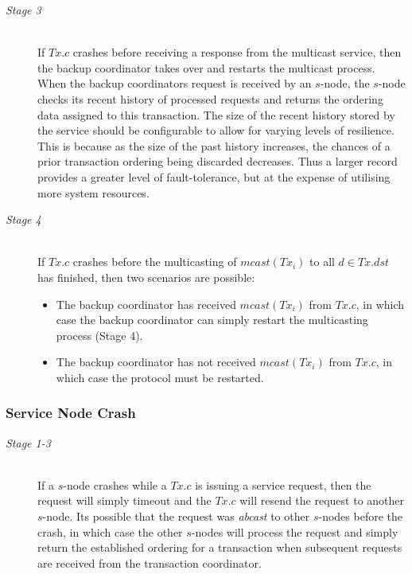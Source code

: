 \begin{description}
        \item[\emph{Stage 3}]  \hfill \\
        If $Tx.c$ crashes before receiving a response from the multicast service, then the backup coordinator takes over and restarts the multicast process.  When the backup coordinators request is received by an $s$-node, the $s$-node checks its recent history of processed requests and returns the ordering data assigned to this transaction.  The size of the recent history stored by the service should be configurable to allow for varying levels of resilience.   This is because as the size of the past history increases, the chances of a prior transaction ordering being discarded decreases.  Thus a larger record provides a greater level of fault-tolerance, but at the expense of utilising more system resources.  
        
        \item[\emph{Stage 4}]  \hfill \\
        If $Tx.c$ crashes before the multicasting of $mcast(Tx_i)$ to all $d \in Tx.dst$ has finished, then two scenarios are possible:
           \begin{itemize}
			    \item    The backup coordinator has received $mcast(Tx_i)$ from $Tx.c$, in which case the backup coordinator can simply restart the multicasting process (Stage 4).
			    \item    The backup coordinator has not received $mcast(Tx_i)$ from $Tx.c$, in which case the protocol must be restarted.  
		    \end{itemize}  
    \end{description}
    
	\subsubsection*{Service Node Crash}
	\begin{description}
       \item[\emph{Stage 1-3}] \hfill \\
       If a $s$-node crashes while a $Tx.c$ is issuing a service request, then the request will simply timeout and the $Tx.c$ will resend the request to another $s$-node.  Its possible that the request was \emph{abcast} to other $s$-nodes before the crash, in which case the other $s$-nodes will process the request and simply return the established ordering for a transaction when subsequent requests are received from the transaction coordinator.  
    \end{description}
    
